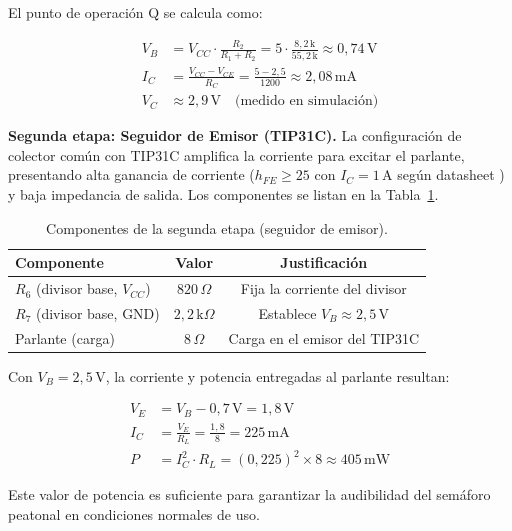 \documentclass[12pt,onecolumn]{IEEEtran}
\begin{document}
El punto de operación Q se calcula como:

\begin{align}
    V_B &= V_{CC} \cdot \frac{R_2}{R_1 + R_2}
         = 5 \cdot \frac{8{,}2\,\text{k}}{55{,}2\,\text{k}}
         \approx 0{,}74\,\text{V} \\
    I_C &= \frac{V_{CC} - V_{CE}}{R_C}
         = \frac{5 - 2{,}5}{1200}
         \approx 2{,}08\,\text{mA} \\
    V_C &\approx 2{,}9\,\text{V} \quad \text{(medido en simulación)}
\end{align}

\textbf{Segunda etapa: Seguidor de Emisor (TIP31C).}
La configuración de colector común con TIP31C amplifica la corriente para excitar el parlante, presentando alta ganancia de corriente ($h_{FE} \geq 25$ con $I_C = 1\,\text{A}$ según datasheet \cite{tip31ds}) y baja impedancia de salida. Los componentes se listan en la Tabla~\ref{tab:seguidor_emisor}.

\begin{table}[H]
\centering
\caption{Componentes de la segunda etapa (seguidor de emisor).}
\label{tab:seguidor_emisor}
\begin{tabular}{lcc}
\toprule
\textbf{Componente} & \textbf{Valor} & \textbf{Justificación} \\
\midrule
$R_6$ (divisor base, $V_{CC}$) & $820\,\Omega$           & Fija la corriente del divisor \\
$R_7$ (divisor base, GND)      & $2{,}2\,\text{k}\Omega$ & Establece $V_B \approx 2{,}5\,\text{V}$ \\
Parlante (carga)               & $8\,\Omega$             & Carga en el emisor del TIP31C \\
\bottomrule
\end{tabular}
\end{table}

Con $V_B = 2{,}5\,\text{V}$, la corriente y potencia entregadas al parlante resultan:

\begin{align}
    V_E &= V_B - 0{,}7\,\text{V} = 1{,}8\,\text{V} \\
    I_C &= \frac{V_E}{R_L} = \frac{1{,}8}{8} = 225\,\text{mA} \\
    P   &= I_C^2 \cdot R_L = (0{,}225)^2 \times 8 \approx 405\,\text{mW}
\end{align}

Este valor de potencia es suficiente para garantizar la audibilidad del semáforo peatonal en condiciones normales de uso.
\end{document}
